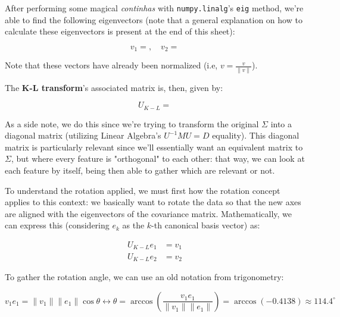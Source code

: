 \documentclass[12pt]{article}
\begin{document}
\begin{enumerate}[leftmargin=\labelsep]
  After performing some magical \textit{continhas} with \texttt{numpy.linalg}'s \texttt{eig}
  method, we're able to find the following eigenvectors (note that a general explanation
  on how to calculate these eigenvectors is present at the end of this sheet):

  \begin{equation*}
    v_1 = , \quad v_2 = 
  \end{equation*}

  Note that these vectors have already been normalized (i.e, $v = \frac{v}{\|v\|}$).

  The \textbf{K-L transform}'s associated matrix is, then, given by:

  \begin{equation*}
    U_{K-L} = 
  \end{equation*}

  As a side note, we do this since we're trying to transform the original
  $\Sigma$ into a diagonal matrix (utilizing Linear Algebra's $U^{-1} M U = D$ equality).
  This diagonal matrix is particularly relevant since we'll essentially
  want an equivalent matrix to $\Sigma$, but where every feature is "orthogonal"
  to each other: that way, we can look at each feature by itself,
  being then able to gather which are relevant or not.

  To understand the rotation applied, we must first how the rotation concept applies
  to this context: we basically want to rotate the data so that the new axes are
  aligned with the eigenvectors of the covariance matrix. Mathematically, we can
  express this (considering $e_k$ as the $k$-th canonical basis vector) as:

  \begin{equation*}
    \begin{aligned}
      U_{K-L} e_1 & = v_1 \\
      U_{K-L} e_2 & = v_2
    \end{aligned}
  \end{equation*}

  To gather the rotation angle, we can use an old notation from trigonometry:

  \begin{equation*}
    v_1 e_1 = \| v_1 \| \| e_1 \| \cos\theta \leftrightarrow
    \theta = \arccos\left(\frac{v_1 e_1}{\| v_1 \| \| e_1 \|}\right)
    = \arccos (-0.4138) \approx 114.4^\circ
  \end{equation*}


\end{enumerate}
\end{document}
